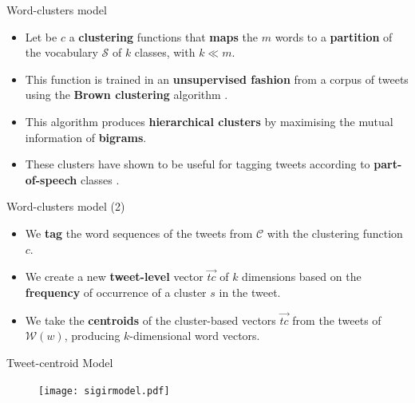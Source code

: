 \documentclass[handout]{beamer}
\begin{document}
\begin{frame}{Word-clusters model}
\begin{scriptsize}
\begin{itemize}

\item Let be $c$ a \textbf{clustering} functions that \textbf{maps} the $m$ words to a \textbf{partition} of the vocabulary $\mathcal{S}$ of $k$ classes, with $k \ll m$. 
\item This function is trained in an \textbf{unsupervised fashion} from a corpus of tweets using the \textbf{Brown clustering} algorithm \cite{brown1992class}. 
\item This algorithm produces \textbf{hierarchical clusters} by maximising the mutual information of \textbf{bigrams}.
\item These clusters have shown to be useful for tagging tweets according to \textbf{part-of-speech} classes \cite{twitterNLP}.
\end{itemize}
\end{scriptsize}
\end{frame}


\begin{frame}{Word-clusters model (2)}
\begin{scriptsize}
\begin{itemize}
\item We \textbf{tag} the word sequences of the tweets from $\mathcal{C}$ with the clustering function $c$.
\item We create a new \textbf{tweet-level} vector $\overrightarrow{tc}$ of $k$ dimensions based on the \textbf{frequency} of occurrence of a cluster $s$ in the tweet. 
\item We take the \textbf{centroids} of the cluster-based vectors $\overrightarrow{tc}$ from the tweets of $\mathcal{W}(w)$, producing $k$-dimensional word vectors.

\end{itemize}
\end{scriptsize}
\end{frame}

\begin{frame}{Tweet-centroid Model}

\begin{figure}[htb]
	\centering
	 \texttt{[image: sigirmodel.pdf]}
\end{figure}



\end{frame}
\end{document}
